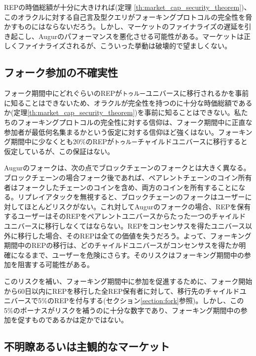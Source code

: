 \documentclass[floatfix,reprint,nofootinbib,amsmath,amssymb,epsfig,pre,floats,letterpaper,groupedaffiliation]{revtex4-1}
\theoremstyle{definition}
\theoremstyle{definition}
\theoremstyle{definition}
\begin{document}
REPの時価総額が十分に大きければ(定理 \ref{th:market_cap_security_theorem})、このオラクルに対する自己言及型クエリがフォーキングプロトコルの完全性を脅かすものにはならないだろう。しかし、マーケットのファイナライズの遅延を引き起こし、Augurのパフォーマンスを悪化させる可能性がある。マーケットは正しくファイナライズされるが、こういった挙動は破壊的で望ましくない。

\subsection{フォーク参加の不確実性}\label{subsection:uncertain_fork_participation}

フォーク期間中にどれぐらいのREPが\texttt{トゥルー}ユニバースに移行されるかを事前に知ることはできないため、オラクルが完全性を持つのに十分な時価総額であるか(定理\ref{th:market_cap_security_theorem})を事前に知ることはできない。私たちのフォーキングプロトコルの完全性に対する信仰は、フォーク期間中に正直な参加者が最低何名集まるかという仮定に対する信仰ほど強くはない。フォーキング期間中に少なくとも20\%のREPが\texttt{トゥルー}チャイルドユニバースに移行すると仮定しているが、この保証はない。

Augurのフォークは、次の点でブロックチェーンのフォークとは大きく異なる。ブロックチェーンの場合フォーク後であれば、ペアレントチェーンのコイン所有者はフォークしたチェーンのコインを含め、両方のコインを所有することになる。リプレイアタックを無視すると、ブロックチェーンのフォークはユーザーに対してほとんどリスクがない。これ対してAugurのフォークの場合、REPを保有するユーザーはそのREPをペアレントユニバースからたった一つのチャイルドユニバースに移行しなくてはならない。REPをコンセンサスを得たユニバース以外に移行した場合、そのREPは全ての価値を失うだろう。よって、フォーキング期間中のREPの移行は、どのチャイルドユニバースがコンセンサスを得たか明確になるまで、ユーザーを危険にさらす。そのリスクはフォーキング期間中の参加を阻害する可能性がある。

このリスクを補い、フォーキング期間中に参加を促進するために、フォーク開始から60日以内にREPを移行した全REP保有者に対して、移行先のチャイルドユニバースで5\%のREPを付与する(セクション\ref{section:fork}参照)。しかし、この5\%のボーナスがリスクを補うのに十分な数字であり、フォーキング期間中の参加を促すものであるかは定かではない。

\subsection{不明瞭あるいは主観的なマーケット}\label{section:ambiguous_or_subjective_markets}
\end{document}

